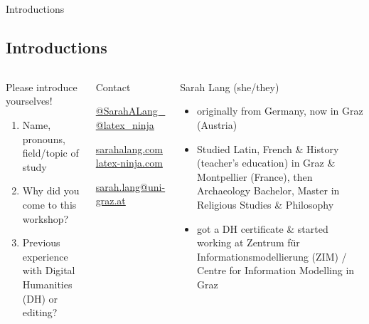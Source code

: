 \begin{frame}{Introductions}
\subsection{Introductions}
  \begin{columns}[T,onlytextwidth]
      \begin{alertblock}{Please introduce yourselves!}
      \footnotesize
        \begin{enumerate}
            \item Name, pronouns, field/topic of study
            \item Why did you come to this workshop?
            \item Previous experience with Digital Humanities (DH) or editing?
        \end{enumerate}
      \end{alertblock}

 { 
      \begin{block}{Contact} 
      \begin{description}\scriptsize 
        \item[\faTwitter] \href{https://twitter.com/SarahALang_}{@SarahALang\_} \\ \href{https://twitter.com/latex_ninja}{@latex\_ninja}
        \item[\faHome] \protect\url{sarahalang.com} \\ \protect\url{latex-ninja.com}
        \item[\faAt] \protect\url{sarah.lang@uni-graz.at}
      \end{description}
      \end{block}
      }

      \begin{block}{Sarah Lang (she/they)}
      \scriptsize
      \begin{itemize}
          \item originally from Germany, now in Graz (Austria)
          \item Studied Latin, French \& History (teacher's education) in Graz \& Montpellier (France), then Archaeology Bachelor, Master in Religious Studies \& Philosophy
          \item got a DH certificate \& started working at Zentrum für Informationsmodellierung (ZIM) / Centre for Information Modelling in Graz
          

\end{itemize}
\end{block}
\end{columns}
\end{frame}
